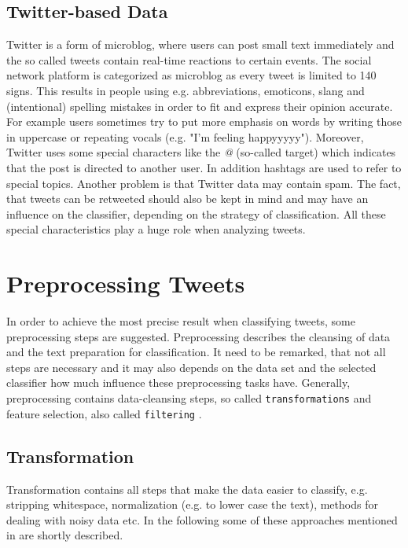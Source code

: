 \documentclass{acm_proc_article-sp}
\begin{document}
\subsection{Twitter-based Data} \label{twitter-based} Twitter is a form of
microblog, where users can post small text immediately and the so called tweets
contain real-time reactions to certain events. The social network platform is
categorized as microblog as every tweet is limited to 140 signs. This results
in people using e.g. abbreviations, emoticons, slang and (intentional) spelling
mistakes in order to fit and express their opinion accurate. For example users
sometimes try to put more emphasis on words by writing those in uppercase or
repeating vocals (e.g. "I'm feeling happyyyyy"). Moreover, Twitter uses some
special characters like the \emph{@} (so-called target) which indicates that
the post is directed to another user. In addition hashtags are used to refer to
special topics.  Another problem is that Twitter data may contain spam. The
fact, that tweets can be retweeted should also be kept in mind and may have an
influence on the classifier, depending on the strategy of classification.  All
these special characteristics play a huge role when analyzing tweets.
\cite{agarwal2011sentiment, read2005using}


\section{Preprocessing Tweets} \label{preprocessing} In order to achieve the
most precise result when classifying tweets, some preprocessing steps are
suggested. Preprocessing describes the cleansing of data and the text
preparation for classification. It need to be remarked, that not all steps are
necessary and it may also depends on the data set and the selected classifier
how much influence these preprocessing tasks have.  Generally, preprocessing
contains data-cleansing steps, so called \texttt{transformations} and feature
selection, also called \texttt{filtering} \cite{haddi2013therole}.


\subsection{Transformation} Transformation contains all steps that make the
data easier to classify, e.g. stripping whitespace, normalization (e.g. to
lower case the text), methods for dealing with noisy data etc.  In the
following some of these approaches mentioned in \cite{ting2011naive,
pak2010twitter, go2009twitter, agarwal2011sentiment, pang2008opinion,
haddi2013therole} are shortly described.
\end{document}
